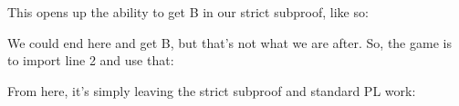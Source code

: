 This opens up the ability to get B in our strict subproof, like so:

\begin{fitchproof}
\open
{} 
\end{fitchproof}
We could end here and get \ediamond B, but that's not what we are after. So, the game is to import line 2 and use that:

\begin{fitchproof}
\open
{} 
\end{fitchproof}
From here, it's simply leaving the strict subproof and standard PL work: 


\begin{fitchproof}
\open
{} 
\close
{}
\end{fitchproof}
